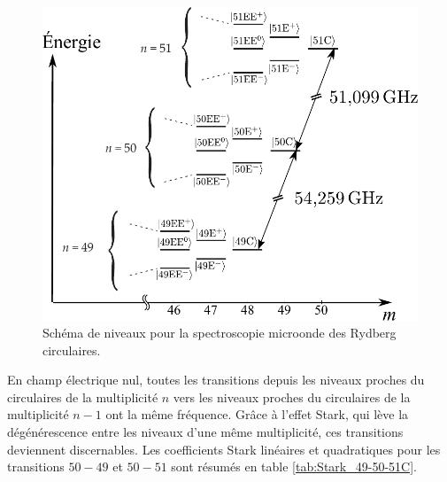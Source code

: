 \begin{figure}[h]
\centering
\includegraphics[width=.7\linewidth]{figures/circulars/levels_49-50-51C}
\caption[Schéma de niveaux pour la spectroscopie microonde des Rydberg circulaires]{
Schéma de niveaux pour la spectroscopie microonde des Rydberg circulaires.
}
\label{fig:levels_49-50-51C}
\end{figure}
%

En champ électrique nul, toutes les transitions depuis les niveaux proches du circulaires de la multiplicité $n$ vers les niveaux proches du circulaires de la multiplicité $n-1$ ont la même fréquence.
Grâce à l'effet Stark, qui lève la dégénérescence entre les niveaux d'une même multiplicité, ces transitions deviennent discernables.
Les coefficients Stark linéaires et quadratiques pour les transitions $50-49$ et $50-51$ sont résumés en table \eqref{tab:Stark_49-50-51C}.		

